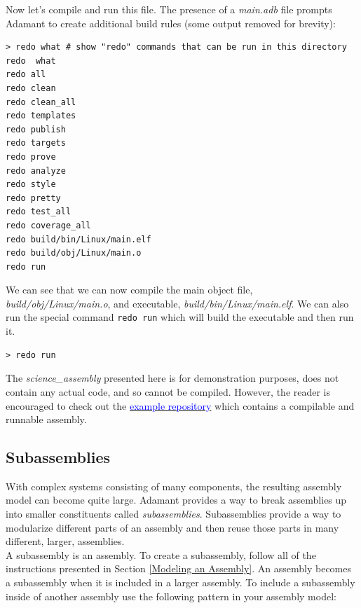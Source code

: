 Now let's compile and run this file. The presence of a \textit{main.adb} file prompts Adamant to create additional build rules (some output removed for brevity):

\vspace{5mm} %
\begin{verbatim}
> redo what # show "redo" commands that can be run in this directory
redo  what
redo all
redo clean
redo clean_all
redo templates
redo publish
redo targets
redo prove
redo analyze
redo style
redo pretty
redo test_all
redo coverage_all
redo build/bin/Linux/main.elf
redo build/obj/Linux/main.o
redo run
\end{verbatim}
\vspace{5mm} %

We can see that we can now compile the main object file, \textit{build/obj/Linux/main.o}, and executable, \textit{build/bin/Linux/main.elf}. We can also run the special command \texttt{redo run} which will build the executable and then run it.

\vspace{5mm} %
\begin{verbatim}
> redo run
\end{verbatim}
\vspace{5mm} %

The \textit{science\_assembly} presented here is for demonstration purposes, does not contain any actual code, and so cannot be compiled. However, the reader is encouraged to check out the \href{https://github.com/lasp/adamant_example/tree/main}{\textcolor{blue}{example repository}} which contains a compilable and runnable assembly. \\
 
\subsection{Subassemblies}

With complex systems consisting of many components, the resulting assembly model can become quite large. Adamant provides a way to break assemblies up into smaller constituents called \textit{subassemblies}. Subassemblies provide a way to modularize different parts of an assembly and then reuse those parts in many different, larger, assemblies. \\

A subassembly is an assembly. To create a subassembly, follow all of the instructions presented in Section \ref{Modeling an Assembly}. An assembly becomes a subassembly when it is included in a larger assembly. To include a subassembly inside of another assembly use the following pattern in your assembly model: \\

